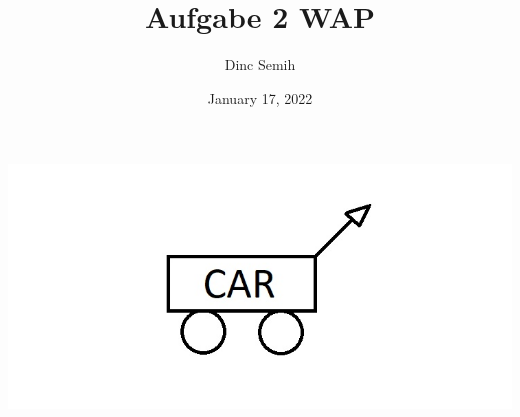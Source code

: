 \documentclass{article}
\title{Aufgabe 2 WAP}
\author{Dinc Semih}
\date{January 17, 2022}
\begin{document}
	\maketitle
	\begin{center}
		\includegraphics[angle= 50, origin = c, scale=0.5]{Grafik}
	\end{center}
\end{document}
